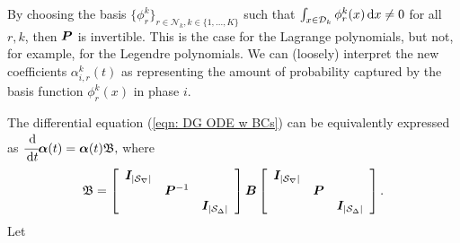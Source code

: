 By choosing the basis \(\{\phi_{r}^k\}_{r\in\mathcal N_k,k\in\{1,...,K\}}\) such that \(\int_{x\in\mathcal{D}_k}\phi_r^k(x)\, \mathrm{d} x\neq 0\) for all \(r,k\), then \(\boldsymbol P\) is invertible. This is the case for the Lagrange polynomials, but not, for example, for the Legendre polynomials. We can (loosely) interpret the new coefficients \(\alpha_{i,r}^k(t)\) as representing the amount of probability captured by the basis function \(\phi_r^k(x)\) in phase \(i\).

The differential equation (\ref{eqn: DG ODE w BCs}) can be equivalently expressed as 
\(\label{eqn: DG alpha ODE w BCs}
	\cfrac{\, \mathrm{d}}{\, \mathrm{d} t} \boldsymbol \alpha(t)
	= \boldsymbol \alpha(t)  { \mathfrak{\boldsymbol B}},
\)
where 
\[ {\mathfrak{\boldsymbol B}} = \left[\begin{array}{ccc}
		\boldsymbol I_{|\mathcal{S}_\nabla|} & & \\
		& \boldsymbol P^{-1} &  \\
		& & \boldsymbol I_{|\mathcal{S}_\Delta|}
	\end{array}\right]
	\boldsymbol B
	\left[\begin{array}{ccc}
		\boldsymbol I_{|\mathcal{S}_\nabla|} & & \\
		& \boldsymbol P&  \\
		& & \boldsymbol I_{|\mathcal{S}_\Delta|}
	\end{array}\right].\] 
Let
